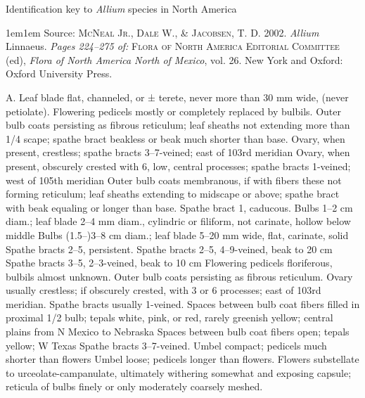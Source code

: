 \documentclass[a4paper]{article}
\def\var{\textup{var.} }
\begin{document}
\vspace*{1cm}
\centerline{\Large Identification key to \textit{Allium} species in North America}
\vskip8mm

\begingroup
\leftskip1em\rightskip1em
\noindent Source: \textsc{McNeal Jr., Dale W., \& Jacobsen, T. D.} 2002. \textit{Allium} Linnaeus. \textit{Pages 224--275 of:} \textsc{Flora of North America Editorial Committee} (ed), \textit{Flora of North America North of Mexico}, vol. 26. New York and Oxford: Oxford University Press.\par\endgroup

\vskip8mm

\begin{Key}{A. }
\alter Leaf blade flat, channeled, or ± terete, never more than 30 mm wide, (never petiolate).
\alter Flowering pedicels mostly or completely replaced by bulbils.
\alter Outer bulb coats persisting as fibrous reticulum; leaf sheaths not extending more than 1/4 scape; spathe bract beakless or beak much shorter than base.
\alter Ovary, when present, crestless; spathe bracts 3--7-veined; east of 103rd meridian
\alter Ovary, when present, obscurely crested with 6, low, central processes; spathe bracts 1-veined; west of 105th meridian
\alter Outer bulb coats membranous, if with fibers these not forming reticulum; leaf sheaths extending to midscape or above; spathe bract with beak equaling or longer than base.
\alter Spathe bract 1, caducous.
\alter Bulbs 1--2 cm diam.; leaf blade 2--4 mm diam., cylindric or filiform, not carinate, hollow below middle
\alter Bulbs (1.5--)3--8 cm diam.; leaf blade 5--20 mm wide, flat, carinate, solid
\name{sativum \var sativum}
\alter Spathe bracts 2--5, persistent.
\alter Spathe bracts 2--5, 4--9-veined, beak to 20 cm
\alter Spathe bracts 3--5, 2--3-veined, beak to 10 cm
\alter Flowering pedicels floriferous, bulbils almost unknown.
\alter Outer bulb coats persisting as fibrous reticulum.
\alter Ovary usually crestless; if obscurely crested, with 3 or 6 processes; east of 103rd meridian.
\alter Spathe bracts usually 1-veined.
\alter Spaces between bulb coat fibers filled in proximal 1/2 bulb; tepals white, pink, or red, rarely greenish yellow; central plains from N Mexico to Nebraska
\alter Spaces between bulb coat fibers open; tepals yellow; W Texas
\alter Spathe bracts 3--7-veined.
\alter Umbel compact; pedicels much shorter than flowers
\alter Umbel loose; pedicels longer than flowers.
\alter Flowers substellate to urceolate-campanulate, ultimately withering somewhat and exposing capsule; reticula of bulbs finely or only moderately coarsely meshed.

\end{Key}
\end{document}
